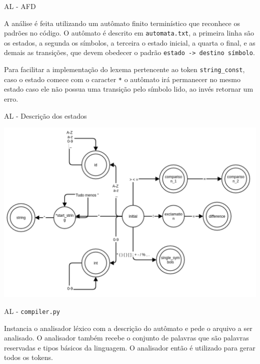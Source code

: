\documentclass[10pt]{beamer}
\begin{document}
\begin{frame}{AL - AFD}

    A análise é feita utilizando um autômato finito terminístico que reconhece
    os padrões no código. O autômato é descrito em \texttt{automata.txt}, a
    primeira linha são os estados, a segunda os símbolos, a terceira o estado
    inicial, a quarta o final, e as demais as transições, que devem obedecer o
    padrão \texttt{estado -> destino símbolo}.

    Para facilitar a implementação do lexema pertencente ao token
    \texttt{string\_const}, caso o estado comece com o caracter \texttt{*} o
    autômato irá permanecer no mesmo estado caso ele não possua uma transição
    pelo símbolo lido, ao invés retornar um erro.

\end{frame}

\begin{frame}{AL - Descrição dos estados}

    \includegraphics[width=\textwidth,height=\textheight,keepaspectratio]{automata_description.pdf}

\end{frame}

\begin{frame}{AL - \texttt{compiler.py}}

    Instancia o analisador léxico com a descrição do autômato e pede o arquivo
    a ser analisado. O analisador também recebe o conjunto de palavras que são
    palavras reservadas e tipos básicos da linguagem. O analisador então é
    utilizado para gerar todos os tokens.

\end{frame}
\end{document}
